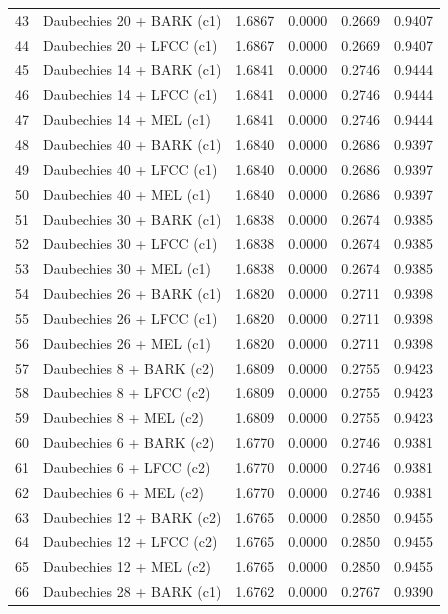 \begin{longtable}{@{}rlrrrr@{}}
43 & Daubechies 20 + BARK (c1) & 1.6867 & 0.0000 & 0.2669 & 0.9407 \\
44 & Daubechies 20 + LFCC (c1) & 1.6867 & 0.0000 & 0.2669 & 0.9407 \\
45 & Daubechies 14 + BARK (c1) & 1.6841 & 0.0000 & 0.2746 & 0.9444 \\
46 & Daubechies 14 + LFCC (c1) & 1.6841 & 0.0000 & 0.2746 & 0.9444 \\
47 & Daubechies 14 + MEL (c1) & 1.6841 & 0.0000 & 0.2746 & 0.9444 \\
48 & Daubechies 40 + BARK (c1) & 1.6840 & 0.0000 & 0.2686 & 0.9397 \\
49 & Daubechies 40 + LFCC (c1) & 1.6840 & 0.0000 & 0.2686 & 0.9397 \\
50 & Daubechies 40 + MEL (c1) & 1.6840 & 0.0000 & 0.2686 & 0.9397 \\
51 & Daubechies 30 + BARK (c1) & 1.6838 & 0.0000 & 0.2674 & 0.9385 \\
52 & Daubechies 30 + LFCC (c1) & 1.6838 & 0.0000 & 0.2674 & 0.9385 \\
53 & Daubechies 30 + MEL (c1) & 1.6838 & 0.0000 & 0.2674 & 0.9385 \\
54 & Daubechies 26 + BARK (c1) & 1.6820 & 0.0000 & 0.2711 & 0.9398 \\
55 & Daubechies 26 + LFCC (c1) & 1.6820 & 0.0000 & 0.2711 & 0.9398 \\
56 & Daubechies 26 + MEL (c1) & 1.6820 & 0.0000 & 0.2711 & 0.9398 \\
57 & Daubechies 8 + BARK (c2) & 1.6809 & 0.0000 & 0.2755 & 0.9423 \\
58 & Daubechies 8 + LFCC (c2) & 1.6809 & 0.0000 & 0.2755 & 0.9423 \\
59 & Daubechies 8 + MEL (c2) & 1.6809 & 0.0000 & 0.2755 & 0.9423 \\
60 & Daubechies 6 + BARK (c2) & 1.6770 & 0.0000 & 0.2746 & 0.9381 \\
61 & Daubechies 6 + LFCC (c2) & 1.6770 & 0.0000 & 0.2746 & 0.9381 \\
62 & Daubechies 6 + MEL (c2) & 1.6770 & 0.0000 & 0.2746 & 0.9381 \\
63 & Daubechies 12 + BARK (c2) & 1.6765 & 0.0000 & 0.2850 & 0.9455 \\
64 & Daubechies 12 + LFCC (c2) & 1.6765 & 0.0000 & 0.2850 & 0.9455 \\
65 & Daubechies 12 + MEL (c2) & 1.6765 & 0.0000 & 0.2850 & 0.9455 \\
66 & Daubechies 28 + BARK (c1) & 1.6762 & 0.0000 & 0.2767 & 0.9390 \\

\end{longtable}
